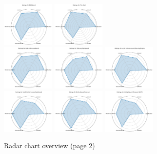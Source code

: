 \documentclass{article}
\begin{document}
\begin{figure}[ht!]
\includegraphics[width=0.2333\textwidth]{PDEBench_radar.pdf}
\includegraphics[width=0.2333\textwidth]{The Well_radar.pdf}
\\[1ex]
\includegraphics[width=0.2333\textwidth]{LLM-Inference-Bench_radar.pdf}
\includegraphics[width=0.2333\textwidth]{SGLang Framework_radar.pdf}
\includegraphics[width=0.2333\textwidth]{vLLM Inference and Serving Engine_radar.pdf}
\\[1ex]
\includegraphics[width=0.2333\textwidth]{vLLM Performance Dashboard_radar.pdf}
\includegraphics[width=0.2333\textwidth]{Nixtla NeuralForecast_radar.pdf}
\includegraphics[width=0.2333\textwidth]{Nixtla Neural Forecast NHITS_radar.pdf}
\\[1ex]
\caption{Radar chart overview (page 2)}
\end{figure}
\end{document}
